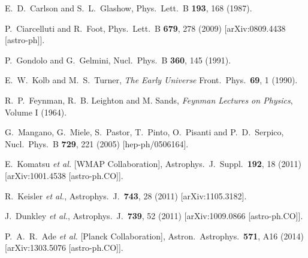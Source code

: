 \documentclass[12pt]{article}
\begin{document}
{{\begin{thebibliography}{999}
 E.~D.~Carlson and S.~L.~Glashow,
 Phys.\ Lett.\ B {\bf 193}, 168 (1987).
  
  P.~Ciarcelluti and R.~Foot,
  Phys.\ Lett.\ B {\bf 679}, 278 (2009)
  [arXiv:0809.4438 [astro-ph]].
  
  P.~Gondolo and G.~Gelmini,
  Nucl.\ Phys.\ B {\bf 360}, 145 (1991).

  E.~W.~Kolb and M.~S.~Turner,
  {\it The Early Universe}
  Front.\ Phys.\  {\bf 69}, 1 (1990).
  
  R.~P.~Feynman, R.~B. Leighton and M. Sands, {\it Feynman Lectures on
Physics}, Volume I (1964). 
 
  G.~Mangano, G.~Miele, S.~Pastor, T.~Pinto, O.~Pisanti and
P.~D.~Serpico,
  Nucl.\ Phys.\ B {\bf 729}, 221 (2005)
  [hep-ph/0506164].
  
  E.~Komatsu {\it et al.}  [WMAP Collaboration],
  Astrophys.\ J.\ Suppl.\  {\bf 192}, 18 (2011)
  [arXiv:1001.4538 [astro-ph.CO]].
  
   R.~Keisler {\it et al.},
Astrophys.\ J.\  {\bf 743}, 28 (2011) [arXiv:1105.3182].
  
  J.~Dunkley {\it et al.},
  Astrophys.\ J.\  {\bf 739}, 52 (2011)
  [arXiv:1009.0866 [astro-ph.CO]].
 
  P.~A.~R.~Ade {\it et al.}  [Planck Collaboration],
  Astron.\ Astrophys.\  {\bf 571}, A16 (2014)
  [arXiv:1303.5076 [astro-ph.CO]].


\end{thebibliography}}}
\end{document}
